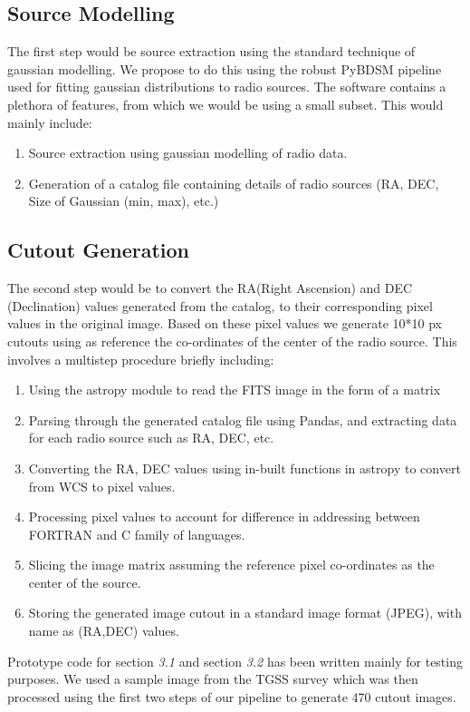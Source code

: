 \documentclass{article}
\begin{document}
\begin{multicols*}{2}
\subsection{Source Modelling}
  The first step would be source extraction using the standard technique of gaussian modelling. We propose to do this using the robust PyBDSM pipeline used for fitting gaussian distributions to radio sources. The software contains a plethora of features, from which we would be using a small subset. This would mainly include:

\begin{enumerate}
\item Source extraction using gaussian modelling of radio data.
\item Generation of a catalog file containing details of radio sources (RA, DEC, Size of Gaussian (min, max), etc.)
\end{enumerate}

\subsection{Cutout Generation}
The second step would be to convert the RA(Right Ascension) and DEC (Declination) values generated from the catalog, to their corresponding pixel values in the original image. Based on these pixel values we generate 10*10 px cutouts using as reference the co-ordinates of the center of the radio source. This involves a multistep procedure briefly including:
\begin{enumerate}
\item Using the astropy module to read the FITS image in the form of a matrix
\item Parsing through the generated catalog file using Pandas, and extracting data for each radio source such as RA, DEC, etc.
\item Converting the RA, DEC values using in-built functions in astropy to convert from WCS to pixel values.
\item Processing pixel values to account for difference in addressing between FORTRAN and C family of languages.
\item Slicing the image matrix assuming the reference pixel co-ordinates as the center of the source.
\item Storing the generated image cutout in a standard image format (JPEG), with name as (RA,DEC) values. 
\end{enumerate}

Prototype code for section \textit{3.1} and section \textit{3.2} has been written mainly for testing purposes. We used a sample image from the TGSS survey which was then processed using the first two steps of our pipeline to generate 470 cutout images.


\end{multicols*}
\end{document}
